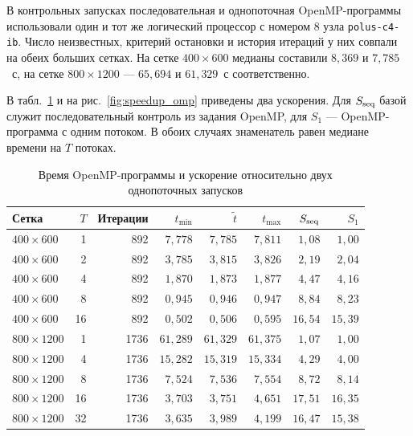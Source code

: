 \documentclass[a4paper,12pt]{extarticle}
\begin{document}
В контрольных запусках последовательная и однопоточная OpenMP-программы использовали один и тот же логический процессор с номером 8 узла \texttt{polus-c4-ib}. Число неизвестных, критерий остановки и история итераций у них совпали на обеих больших сетках. На сетке $400\times600$ медианы составили $8{,}369$ и $7{,}785$~с, на сетке $800\times1200$ --- $65{,}694$ и $61{,}329$~с соответственно.

В табл.~\ref{tab:omp} и на рис.~\ref{fig:speedup_omp} приведены два ускорения. Для $S_{\rm seq}$ базой служит последовательный контроль из задания OpenMP, для $S_1$ --- OpenMP-программа с одним потоком. В обоих случаях знаменатель равен медиане времени на $T$ потоках.

\begin{table}[!htbp]
    \centering
    \begin{singlespace}
    \small
    \setlength{\tabcolsep}{4.5pt}
    \begin{tabular}{lrrrrrrr}
        \toprule
        Сетка & $T$ & Итерации & $t_{\min}$ & $\tilde t$ & $t_{\max}$ & $S_{\rm seq}$ & $S_1$\\
        \midrule
        $400\times600$ & 1 & 892 & $7{,}778$ & $7{,}785$ & $7{,}811$ & $1{,}08$ & $1{,}00$\\
        $400\times600$ & 2 & 892 & $3{,}785$ & $3{,}815$ & $3{,}826$ & $2{,}19$ & $2{,}04$\\
        $400\times600$ & 4 & 892 & $1{,}870$ & $1{,}873$ & $1{,}877$ & $4{,}47$ & $4{,}16$\\
        $400\times600$ & 8 & 892 & $0{,}945$ & $0{,}946$ & $0{,}947$ & $8{,}84$ & $8{,}23$\\
        $400\times600$ & 16 & 892 & $0{,}502$ & $0{,}506$ & $0{,}595$ & $16{,}54$ & $15{,}39$\\
        \midrule
        $800\times1200$ & 1 & 1736 & $61{,}289$ & $61{,}329$ & $61{,}375$ & $1{,}07$ & $1{,}00$\\
        $800\times1200$ & 4 & 1736 & $15{,}282$ & $15{,}319$ & $15{,}334$ & $4{,}29$ & $4{,}00$\\
        $800\times1200$ & 8 & 1736 & $7{,}524$ & $7{,}536$ & $7{,}554$ & $8{,}72$ & $8{,}14$\\
        $800\times1200$ & 16 & 1736 & $3{,}703$ & $3{,}751$ & $4{,}651$ & $17{,}51$ & $16{,}35$\\
        $800\times1200$ & 32 & 1736 & $3{,}635$ & $3{,}989$ & $4{,}199$ & $16{,}47$ & $15{,}38$\\
        \bottomrule
    \end{tabular}
    \end{singlespace}
    \caption{Время OpenMP-программы и ускорение относительно двух однопоточных запусков}
    \label{tab:omp}
\end{table}
\end{document}
